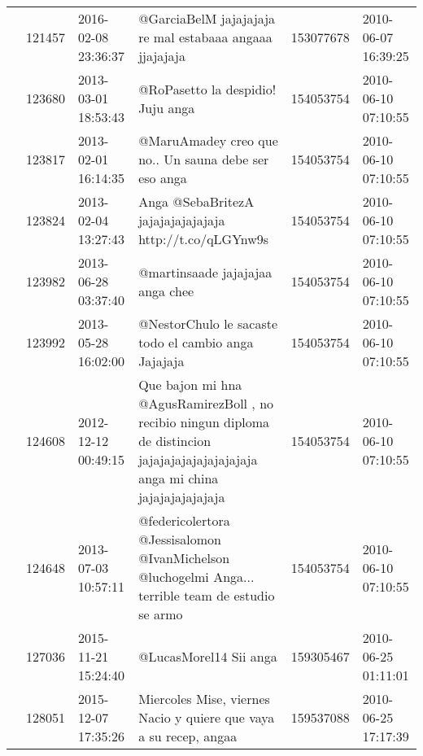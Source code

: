\begin{tabular}{llllrl}
           & 121457  & 2016-02-08 23:36:37 &                                                                                      @GarciaBelM jajajajaja re mal estabaaa angaaa jjajajaja &   153077678 & 2010-06-07 16:39:25 \\
           & 123680  & 2013-03-01 18:53:43 &                                                                                                            @RoPasetto la despidio! Juju anga &   154053754 & 2010-06-10 07:10:55 \\
           & 123817  & 2013-02-01 16:14:35 &                                                                                         @MaruAmadey creo que no.. Un sauna debe ser eso anga &   154053754 & 2010-06-10 07:10:55 \\
           & 123824  & 2013-02-04 13:27:43 &                                                                                      Anga @SebaBritezA jajajajajajajaja http://t.co/qLGYnw9s &   154053754 & 2010-06-10 07:10:55 \\
           & 123982  & 2013-06-28 03:37:40 &                                                                                                             @martinsaade jajajajaa anga chee &   154053754 & 2010-06-10 07:10:55 \\
           & 123992  & 2013-05-28 16:02:00 &                                                                                         @NestorChulo le sacaste todo el cambio anga Jajajaja &   154053754 & 2010-06-10 07:10:55 \\
           & 124608  & 2012-12-12 00:49:15 &            Que bajon mi hna @AgusRamirezBoll , no recibio ningun diploma de distincion jajajajajajajajajajaja anga mi china jajajajajajajaja &   154053754 & 2010-06-10 07:10:55 \\
           & 124648  & 2013-07-03 10:57:11 &                                         @federicolertora @Jessisalomon  @IvanMichelson @luchogelmi  Anga... terrible team de estudio se armo &   154053754 & 2010-06-10 07:10:55 \\
           & 127036  & 2015-11-21 15:24:40 &                                                                                                                       @LucasMorel14 Sii anga &   159305467 & 2010-06-25 01:11:01 \\
           & 128051  & 2015-12-07 17:35:26 &                                                                            Miercoles Mise, viernes Nacio y quiere que vaya a su recep, angaa &   159537088 & 2010-06-25 17:17:39 \\

\end{tabular}
